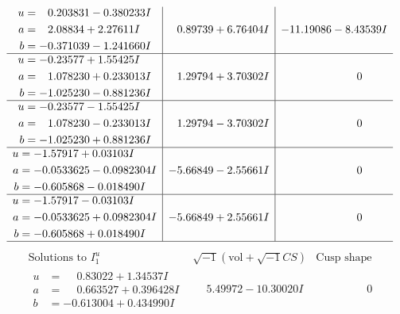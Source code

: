 \documentclass[1p]{elsarticle_modified}
\theoremstyle{definition}
\newcommand{\I}{\sqrt{-1}}
\begin{document}
$$\begin{array}{c|c|c}
\begin{aligned}
u &= \phantom{-}0.203831 - 0.380233 I \\
a &= \phantom{-}2.08834 + 2.27611 I \\
b &= -0.371039 - 1.241660 I\end{aligned}
 & \phantom{-}0.89739 + 6.76404 I & -11.19086 - 8.43539 I \\ \hline\begin{aligned}
u &= -0.23577 + 1.55425 I \\
a &= \phantom{-}1.078230 + 0.233013 I \\
b &= -1.025230 - 0.881236 I\end{aligned}
 & \phantom{-}1.29794 + 3.70302 I & \phantom{-0.000000 } 0 \\ \hline\begin{aligned}
u &= -0.23577 - 1.55425 I \\
a &= \phantom{-}1.078230 - 0.233013 I \\
b &= -1.025230 + 0.881236 I\end{aligned}
 & \phantom{-}1.29794 - 3.70302 I & \phantom{-0.000000 } 0 \\ \hline\begin{aligned}
u &= -1.57917 + 0.03103 I \\
a &= -0.0533625 - 0.0982304 I \\
b &= -0.605868 - 0.018490 I\end{aligned}
 & -5.66849 - 2.55661 I & \phantom{-0.000000 } 0 \\ \hline\begin{aligned}
u &= -1.57917 - 0.03103 I \\
a &= -0.0533625 + 0.0982304 I \\
b &= -0.605868 + 0.018490 I\end{aligned}
 & -5.66849 + 2.55661 I & \phantom{-0.000000 } 0\\
 \hline 
 \end{array}$$\newpage$$\begin{array}{c|c|c}  
\text{Solutions to }I^u_{1}& \I (\text{vol} + \sqrt{-1}CS) & \text{Cusp shape}\\
 \hline 
\begin{aligned}
u &= \phantom{-}0.83022 + 1.34537 I \\
a &= \phantom{-}0.663527 + 0.396428 I \\
b &= -0.613004 + 0.434990 I\end{aligned}
 & \phantom{-}5.49972 - 10.30020 I & \phantom{-0.000000 } 0 \\ \hline\begin{aligned}

\end{aligned}
\end{array}$$
\end{document}
